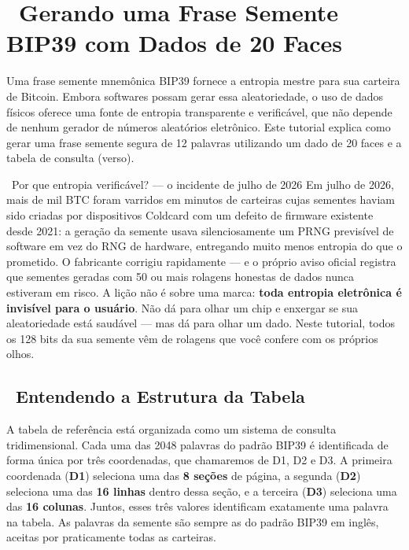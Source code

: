 \documentclass[10pt]{article}
\begin{document}
\section*{\faBitcoin~Gerando uma Frase Semente BIP39 com Dados de 20 Faces}

\footnotesize

Uma frase semente mnemônica BIP39 fornece a entropia mestre para sua carteira de Bitcoin. Embora softwares possam gerar essa aleatoriedade, o uso de dados físicos oferece uma fonte de entropia transparente e verificável, que não depende de nenhum gerador de números aleatórios eletrônico. Este tutorial explica como gerar uma frase semente segura de 12 palavras utilizando um dado de 20 faces e a tabela de consulta (verso).

\begin{contextbox}{\faNewspaper~Por que entropia verificável? --- o incidente de julho de 2026}
Em julho de 2026, mais de mil BTC foram varridos em minutos de carteiras cujas sementes haviam sido criadas por dispositivos Coldcard com um defeito de firmware existente desde 2021: a geração da semente usava silenciosamente um PRNG previsível de software em vez do RNG de hardware, entregando muito menos entropia do que o prometido. O fabricante corrigiu rapidamente --- e o próprio aviso oficial registra que sementes geradas com 50 ou mais rolagens honestas de dados nunca estiveram em risco. A lição não é sobre uma marca: \textbf{toda entropia eletrônica é invisível para o usuário}. Não dá para olhar um chip e enxergar se sua aleatoriedade está saudável --- mas dá para olhar um dado. Neste tutorial, todos os 128 bits da sua semente vêm de rolagens que você confere com os próprios olhos.
\end{contextbox}

\subsection*{\faTable~Entendendo a Estrutura da Tabela}

A tabela de referência está organizada como um sistema de consulta
tridimensional. Cada uma das 2048 palavras do padrão BIP39 é identificada de forma única por três coordenadas, que chamaremos de D1, D2 e D3. A primeira coordenada (\textbf{D1}) seleciona uma das \textbf{8 seções} de página, a segunda (\textbf{D2}) seleciona uma das \textbf{16 linhas} dentro dessa seção, e a terceira (\textbf{D3}) seleciona uma das \textbf{16 colunas}. Juntos, esses três valores identificam exatamente uma palavra na tabela. As palavras da semente são sempre as do padrão BIP39 em inglês, aceitas por praticamente todas as carteiras.
\end{document}
